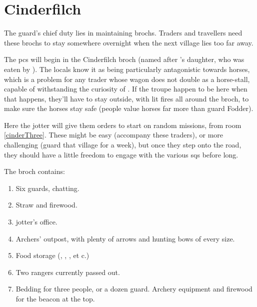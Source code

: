 \section{Cinderfilch }



\begin{multicols}{2}

\noindent
The \gls{guard}'s chief duty lies in maintaining \glspl{broch}.
Traders and travellers need these \glspl{broch} to stay somewhere overnight when the next \gls{village} lies too far away.

The \glspl{pc} will begin in the Cinderfilch \gls{broch} (named after 's daughter, who was eaten by ).
The locals know it as being particularly antagonistic towards horses, which is a problem for any trader whose wagon does not double as a horse-stall, capable of withstanding the curiosity of .
If the troupe happen to be here when that happens, they'll have to stay outside, with lit fires all around the \gls{broch}, to make sure the horses stay safe (people value horses far more than \gls{guard} Fodder).

Here the \gls{jotter} will give them orders to start on random missions, from room \ref{cinderThree}.%
These might be easy (accompany these traders), or more challenging (guard that \gls{village} for a week), but once they step onto the road, they should have a little freedom to engage with the various \glspl{sq} before long.

The \gls{broch} contains:

\begin{enumerate}
  \item
  Six \glspl{guard}, chatting.
  \label{cinderOne}
  \item
  Straw and firewood.
  \label{cinderTwo}
  \item
  \Gls{jotter}'s office.
  \label{cinderThree}
  \item
  Archers' outpost, with plenty of arrows and hunting bows of every size.
  \label{cinderFour}
  \item
  Food storage (\rations, \rations, \rations, et c.)
  \label{cinderFiveSide}
  \item
  Two \glspl{ranger} currently passed out.
  \label{cinderFive}
  \item
  Bedding for three people, or a dozen \gls{guard}.
  Archery equipment and firewood for the beacon at the top.
  \label{cinderSix}
\end{enumerate}

\end{multicols}
